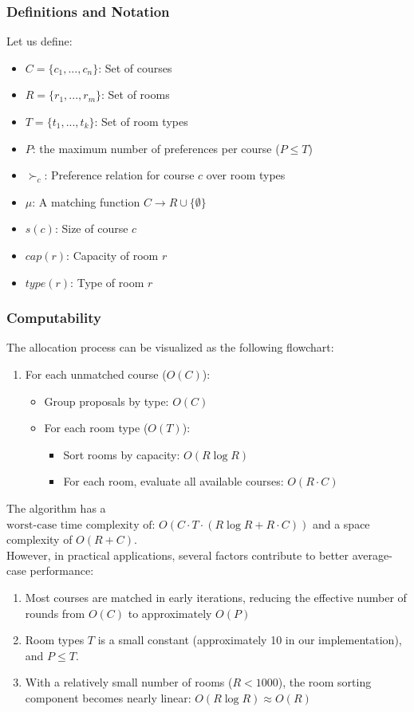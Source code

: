 \documentclass[a4paper, oneside]{article}
\theoremstyle{plain}
\begin{document}
\subsubsection{Definitions and Notation}
Let us define:
\begin{itemize}
	\item $C = \{c_1, ..., c_n\}$: Set of courses
	\item $R = \{r_1, ..., r_m\}$: Set of rooms
	\item $T = \{t_1, ..., t_k\}$: Set of room types
	\item $P$: the maximum number of preferences per course ($P \leq T$)
	\item $\succ_c$: Preference relation for course $c$ over room types
	\item $\mu$: A matching function $C \rightarrow R \cup \{\emptyset\}$
	\item $s(c)$: Size of course $c$
	\item $cap(r)$: Capacity of room $r$
	\item $type(r)$: Type of room $r$
\end{itemize}
\subsubsection{Computability}

The allocation process can be visualized as the following flowchart:
\begin{enumerate}
	\item For each unmatched course ($O(C)$):
	      \begin{itemize}
		      \item Group proposals by type: $O(C)$
		      \item For each room type ($O(T)$):
		            \begin{itemize}
			            \item Sort rooms by capacity: $O(R \log R)$
			            \item For each room, evaluate all available courses: $O(R \cdot C)$
		            \end{itemize}
	      \end{itemize}
\end{enumerate}

The algorithm has a $\boxed{\text{worst-case time complexity of: } O(C \cdot T \cdot (R \log R + R \cdot C))}$ and a space complexity of $O(R + C)$.\\

However, in practical applications, several factors contribute to better average-case performance:
\begin{enumerate}
	\item Most courses are matched in early iterations, reducing the effective number of rounds from $O(C)$ to approximately $O(P)$
	\item Room types $T$ is a small constant (approximately 10 in our implementation), and $P \leq T$.
	\item With a relatively small number of rooms ($R < 1000$), the room sorting component becomes nearly linear: $O(R \log R) \approx O(R)$
\end{enumerate}
\end{document}
